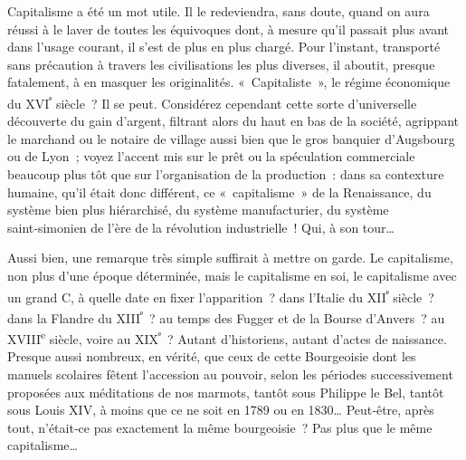\documentclass[french,twoside]{book} %
\newcommand{\astermono}{\medskip\centerline{\color{rubric}\large\selectfont{\syms ✻}}\medskip\par}%
\begin{document}
Capitalisme a été un mot utile. Il le redeviendra, sans doute, quand on aura réussi à le laver de toutes les équivoques dont, à mesure qu’il passait plus avant dans l’usage courant, il s’est de plus en plus chargé. Pour l’instant, transporté sans précaution à travers les civilisations les plus diverses, il aboutit, presque fatalement, à en masquer les originalités. « Capitaliste », le régime économique du XVI\textsuperscript{ᵉ} siècle ? Il se peut. Considérez cependant cette sorte d’universelle découverte du gain d’argent, filtrant alors du haut en bas de la société, agrippant le marchand ou le notaire de village aussi bien que le gros banquier d’Augsbourg ou de Lyon ; voyez l’accent mis sur le prêt ou la spéculation commerciale beaucoup plus tôt que sur l’organisation de la production : dans sa contexture humaine, qu’il était donc différent, ce « capitalisme » de la Renaissance, du système bien plus hiérarchisé, du système manufacturier, du système saint‑simonien de l’ère de la révolution industrielle ! Qui, à son tour…\par
\label{p89}Aussi bien, une remarque très simple suffirait à mettre on garde. Le capitalisme, non plus d’une époque déterminée, mais le capitalisme en soi, le capitalisme avec un grand C, à quelle date en fixer l’apparition ? dans l’Italie du XII\textsuperscript{ᵉ} siècle ? dans la Flandre du XIII\textsuperscript{ᵉ} ? au temps des Fugger et de la Bourse d’Anvers ? au XVIII\textsuperscript{e} siècle, voire au XIX\textsuperscript{ᵉ} ? Autant d’historiens, autant d’actes de naissance. Presque aussi nombreux, en vérité, que ceux de cette Bourgeoisie dont les manuels scolaires fêtent l’accession au pouvoir, selon les périodes successivement proposées aux méditations de nos marmots, tantôt sous Philippe le Bel, tantôt sous Louis XIV, à moins que ce ne soit en 1789 ou en 1830… Peut‑être, après tout, n’était‑ce pas exactement la même bourgeoisie ? Pas plus que le même capitalisme…\par

\astermono
\end{document}
